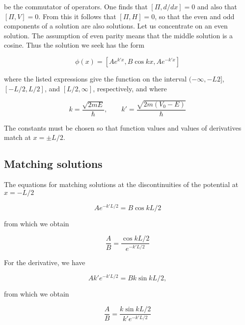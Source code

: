 be the commutator of operators.  One finds that 
$ [\Pi, d/dx ] = 0$ and also that 
$ [ \Pi , V ]  = 0$.  From this it follows that 
$  [  \Pi, H ] = 0  $,
so that the even and odd components of a solution are also solutions. Let us concentrate on an even solution.  The assumption of even parity means that the middle solution is a cosine.  Thus the solution we seek has the form

\begin{equation}
\phi(x) = [Ae^{k'x} , B\cos kx , A e^{-k'x}]
\end{equation}

where the listed expressions give the function on the interval $(-\infty, -L2]$, $[-L/2, L/2]$, and $[L/2, \infty]$, respectively, and 
where

\begin{equation}
k = \frac{\sqrt{2mE}}{\hbar}, \qquad k' = \frac{\sqrt{2m(V_0-E)}}{\hbar}
\end{equation}

The constants must be chosen so that function values and values of derivatives match at $x = \pm L/2$.

\subsection{Matching solutions}


The equations for matching solutions at the discontinuities of the potential at $x = -L/2$

\begin{equation}
Ae^{-k'L/2} = B\cos kL/2 
\end{equation}

from which we obtain

\begin{equation}
\frac{A}{B} = \frac{\cos kL/2}{ e^{-k'L/2} }
\end{equation}

For the derivative, we have

\begin{equation}
Ak'e^{-k'L/2} = Bk\sin kL/2 ,
\end{equation}

from which we obtain

\begin{equation}
\frac{A}{B} = \frac{k\sin kL/2}{ k'e^{-k'L/2} } 
\end{equation}

